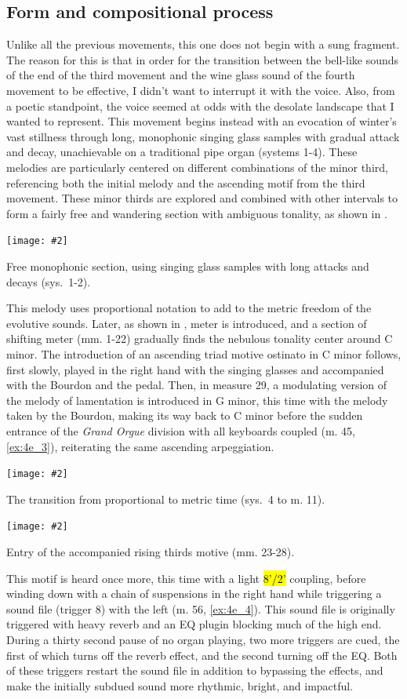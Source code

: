 \documentclass[12pt,twoside,maitrise]{dms_ks}
\newcommand{\customincludeexamples}[4][]{%
    \begin{example}[H]
        \centering
        \texttt{[image: \#2]}
        \caption{#4}
	\label{#3} 
    \end{example}
}
\theoremstyle{definition}
\begin{document}
{\subsection{Form and compositional process}

Unlike all the previous movements, this one does not begin with a sung fragment. The reason for this is that in order for the transition between the bell-like sounds of the end of the third movement and the wine glass sound of the fourth movement to be effective, I didn't want to interrupt it with the voice. Also, from a poetic standpoint, the voice seemed at odds with the desolate landscape that I wanted to represent.
This movement begins instead with an evocation of winter's vast stillness through long, monophonic singing glass samples with gradual attack and decay, unachievable on a traditional pipe organ (systems 1-4).
These melodies are particularly centered on different combinations of the minor third, referencing both the initial melody and the ascending motif from the third movement.
These minor thirds are explored and combined with other intervals to form a fairly free and wandering section with ambiguous tonality, as shown in .

\customincludeexamples[width=\textwidth]{4e_1}{ex:4e_1}{Free monophonic section, using singing glass samples with long attacks and decays (sys.~1-2).}

This melody uses proportional notation to add to the metric freedom of the evolutive sounds. 
Later, as shown in , meter is introduced, and a section of shifting meter (mm. 1-22) gradually finds the nebulous tonality center around C minor.
The introduction of an ascending triad motive ostinato in C minor follows, first slowly, played in the right hand with the singing glasses and accompanied with the Bourdon and the pedal. 
Then, in measure 29, a modulating version of the melody of lamentation is introduced in G minor, this time with the melody taken by the Bourdon, making its way back to C minor before the sudden entrance of the \textit{Grand Orgue} division with all keyboards coupled (m. 45, \cref{ex:4e_3}), reiterating the same ascending arpeggiation. 

\customincludeexamples[width=\textwidth]{4e_2}{ex:4e_2}{The transition from proportional to metric time (sys.~4 to m. 11).}

\customincludeexamples[width=\textwidth]{4e_3}{ex:4e_3}{Entry of the accompanied rising thirds motive (mm. 23-28).}

This motif is heard once more, this time with a light \hl{8'/2'} coupling, before winding down with a chain of suspensions in the right hand while triggering a sound file (trigger 8) with the left (m. 56, \cref{ex:4e_4}). 
This sound file is originally triggered with heavy reverb and an EQ plugin blocking much of the high end. 
During a thirty second pause of no organ playing, two more triggers are cued, the first of which turns off the reverb effect, and the second turning off the EQ. 
Both of these triggers restart the sound file in addition to bypassing the effects, and make the initially subdued sound more rhythmic, bright, and impactful. 

}
\end{document}
